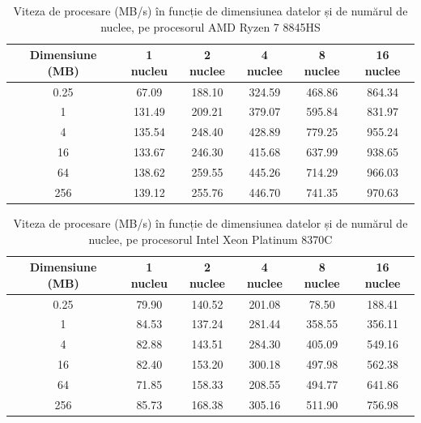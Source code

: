 \begin{table}[!htbp]
    \centering
    \begin{tabular}{|c|c|c|c|c|c|}
        \hline
        \textbf{Dimensiune (MB)} & \textbf{1 nucleu} & \textbf{2 nuclee} & \textbf{4 nuclee} & \textbf{8 nuclee} & \textbf{16 nuclee} \\
        \hline
        0.25 & 67.09  & 188.10 & 324.59 & 468.86 & 864.34 \\
        \hline
        1    & 131.49 & 209.21 & 379.07 & 595.84 & 831.97 \\
        \hline
        4    & 135.54 & 248.40 & 428.89 & 779.25 & 955.24 \\
        \hline
        16   & 133.67 & 246.30 & 415.68 & 637.99 & 938.65 \\
        \hline
        64   & 138.62 & 259.55 & 445.26 & 714.29 & 966.03 \\
        \hline
        256  & 139.12 & 255.76 & 446.70 & 741.35 & 970.63 \\
        \hline
    \end{tabular}
    \caption{Viteza de procesare (MB/s) în funcție de dimensiunea datelor și de numărul de nuclee, pe procesorul AMD Ryzen 7 8845HS}
    \label{tab:viteza-amd}
\end{table}

\begin{table}[!htbp]
    \centering
    \begin{tabular}{|c|c|c|c|c|c|}
        \hline
        \textbf{Dimensiune (MB)} & \textbf{1 nucleu} & \textbf{2 nuclee} & \textbf{4 nuclee} & \textbf{8 nuclee} & \textbf{16 nuclee} \\
        \hline
        0.25 & 79.90 & 140.52 & 201.08 & 78.50  & 188.41 \\
        \hline
        1    & 84.53 & 137.24 & 281.44 & 358.55 & 356.11 \\
        \hline
        4    & 82.88 & 143.51 & 284.30 & 405.09 & 549.16 \\
        \hline
        16   & 82.40 & 153.20 & 300.18 & 497.98 & 562.38 \\
        \hline
        64   & 71.85 & 158.33 & 208.55 & 494.77 & 641.86 \\
        \hline
        256  & 85.73 & 168.38 & 305.16 & 511.90 & 756.98 \\
        \hline
    \end{tabular}
    \caption{Viteza de procesare (MB/s) în funcție de dimensiunea datelor și de numărul de nuclee, pe procesorul Intel Xeon Platinum 8370C}
    \label{tab:viteza-intel}
\end{table}


